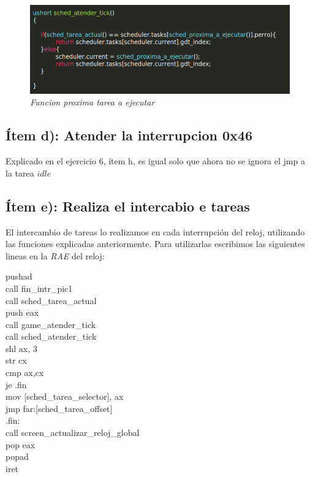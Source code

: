 \begin{figure}[H]
\begin{center}
\includegraphics[width=\linewidth]{ejercicio7/atendtick.png}
\caption{{\small \textit{Funcion proxima tarea a ejecutar }}}
\endminipage
\end{center}
\end{figure}

\subsection{Ítem d):  Atender la interrupcion 0x46}

Explicado en el ejercicio 6, ítem h, es igual solo que ahora no se ignora el jmp a la tarea $idle$

\subsection{Ítem e):  Realiza el intercabio e tareas}

El intercambio de tareas lo realizamos en cada interrupción del reloj, utilizando las funciones explicadas anteriormente. Para utilizarlas escribimos las siguientes lineas en la \textit{RAE} del reloj:

\begin{center}

    pushad \\    
    call fin\_intr\_pic1 \\
    call sched\_tarea\_actual \\
    push eax    \\
    call game\_atender\_tick \\           
    call sched\_atender\_tick \\

    shl ax, 3  \\
    str cx \\
    cmp ax,cx \\
    je .fin \\

    mov [sched_tarea_selector], ax \\
    jmp far:[sched_tarea_offset] \\

    .fin: \\
     call screen\_actualizar\_reloj\_global \\    
    pop eax \\
    popad \\
    iret \\

\end{center}

